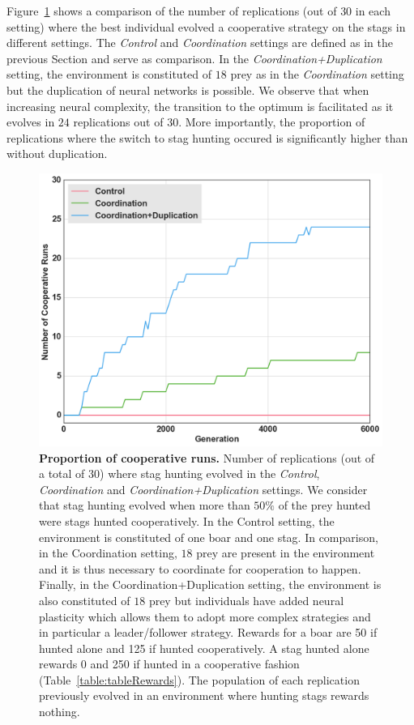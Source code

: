     Figure~\ref{fig:figRecyclingLeadership} shows a comparison of the number of replications (out of $30$ in each setting) where the best individual evolved a cooperative strategy on the stags in different settings. The \emph{Control} and \emph{Coordination} settings are defined as in the previous Section and serve as comparison. In the \emph{Coordination+Duplication} setting, the environment is constituted of $18$ prey as in the \emph{Coordination} setting but the duplication of neural networks is possible. We observe that when increasing neural complexity, the transition to the optimum is facilitated as it evolves in $24$ replications out of $30$. More importantly, the proportion of replications where the switch to stag hunting occured is significantly higher than without duplication. 

    \begin{figure}[h]
      \centering
        \includegraphics[width=0.75\linewidth]{fig/ArticleBio2/Fig4.png}
        \caption{\textbf{Proportion of cooperative runs.}
        Number of replications (out of a total of $30$) where stag hunting evolved in the \emph{Control}, \emph{Coordination} and \emph{Coordination+Duplication} settings. We consider that stag hunting evolved when more than $50\%$ of the prey hunted were stags hunted cooperatively. In the Control setting, the environment is constituted of one boar and one stag. In comparison, in the Coordination setting, $18$ prey are present in the environment and it is thus necessary to coordinate for cooperation to happen. Finally, in the Coordination+Duplication setting, the environment is also constituted of $18$ prey but individuals have added neural plasticity which allows them to adopt more complex strategies and in particular a leader/follower strategy. Rewards for a boar are 50 if hunted alone and 125 if hunted cooperatively. A stag hunted alone rewards 0 and 250 if hunted in a cooperative fashion (Table~\ref{table:tableRewards}). The population of each replication previously evolved in an environment where hunting stags rewards nothing.}
      \label{fig:figRecyclingLeadership}
    \end{figure}

